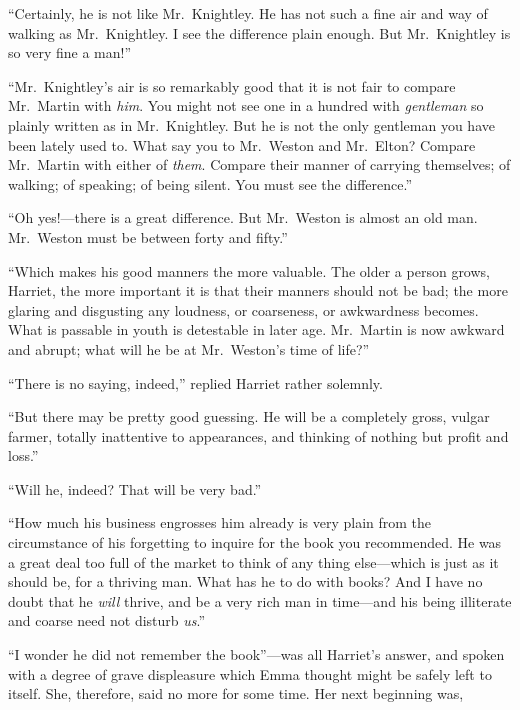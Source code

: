 ``Certainly, he is not like Mr.\ Knightley.  He has not such a fine
air and way of walking as Mr.\ Knightley.  I see the difference
plain enough.  But Mr.\ Knightley is so very fine a man!''

``Mr.\ Knightley's air is so remarkably good that it is not fair
to compare Mr.\ Martin with \emph{him}.  You might not see one in a hundred
with \emph{gentleman} so plainly written as in Mr.\ Knightley.  But he is
not the only gentleman you have been lately used to.  What say you
to Mr.\ Weston and Mr.\ Elton? Compare Mr.\ Martin with either of \emph{them}.
Compare their manner of carrying themselves; of walking; of speaking;
of being silent.  You must see the difference.''

``Oh yes!---there is a great difference.  But Mr.\ Weston is almost
an old man.  Mr.\ Weston must be between forty and fifty.''

``Which makes his good manners the more valuable.  The older a
person grows, Harriet, the more important it is that their manners
should not be bad; the more glaring and disgusting any loudness,
or coarseness, or awkwardness becomes.  What is passable in youth
is detestable in later age.  Mr.\ Martin is now awkward and abrupt;
what will he be at Mr.\ Weston's time of life?''

``There is no saying, indeed,'' replied Harriet rather solemnly.

``But there may be pretty good guessing.  He will be a completely gross,
vulgar farmer, totally inattentive to appearances, and thinking
of nothing but profit and loss.''

``Will he, indeed? That will be very bad.''

``How much his business engrosses him already is very plain from the
circumstance of his forgetting to inquire for the book you recommended.
He was a great deal too full of the market to think of any thing
else---which is just as it should be, for a thriving man.  What has
he to do with books? And I have no doubt that he \emph{will} thrive,
and be a very rich man in time---and his being illiterate and coarse
need not disturb \emph{us}.''

``I wonder he did not remember the book''---was all Harriet's answer,
and spoken with a degree of grave displeasure which Emma thought might
be safely left to itself.  She, therefore, said no more for some time.
Her next beginning was,

